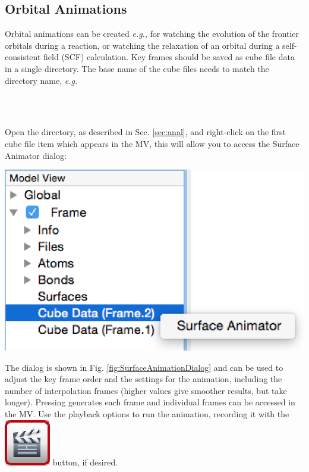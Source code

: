 \documentclass[a4paper,12pt]{article}
\newcommand{\eg}{\emph{e.g.}}
\begin{document}
\newpage
\subsection{Orbital Animations}

Orbital animations can be created \eg{}, for watching the evolution of the
frontier orbitals during a reaction, or watching the relaxation of an orbital
during a self-consistent field (SCF) calculation.  Key frames should be saved
as cube file data in a single directory.  The base name of the cube files needs
to match the directory name, \eg{}

\begin{center}
\hspace*{2em}{\tt  relaxation/relaxation.Frame.1.cube}\\
\hspace*{2em}{\tt  relaxation/relaxation.Frame.2.cube}\\
\end{center}
Open the directory, as described in Sec. \ref{sec:anal}, and right-click on the
first cube file item which appears in the MV, this will allow you to access the 
Surface Animator dialog:
\begin{center}
\includegraphics[scale=0.40]{figures/SurfaceAnimationMenu.png}
\end{center}
The dialog is shown in Fig. \ref{fig:SurfaceAnimationDialog} and can be used to
adjust the key frame order and the settings for the animation, including the
number of interpolation frames (higher values give smoother results, but take
longer).  Pressing  generates each frame and individual
frames can be accessed in the MV.  Use the playback options to run the
animation, recording it with the
\includegraphics[scale=0.40]{figures/RecordButton.png} button, if desired.
\end{document}
